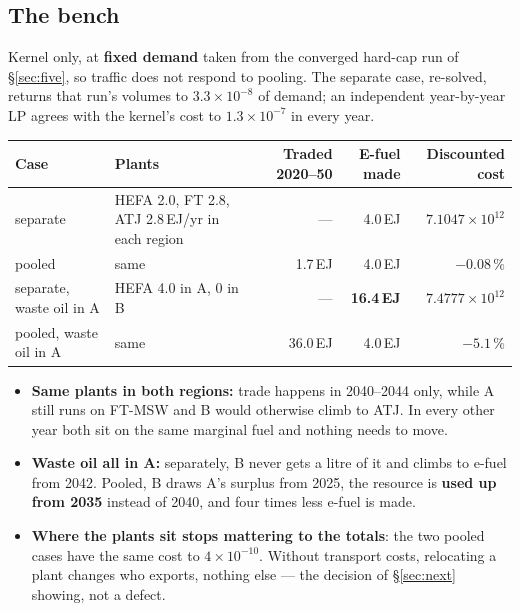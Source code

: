 \documentclass[11pt,a4paper]{article}
\begin{document}
\subsection{The bench}

Kernel only, at \textbf{fixed demand} taken from the converged hard-cap run of
\S\ref{sec:five}, so traffic does not respond to pooling. The separate case, re-solved, returns
that run's volumes to $3.3\times10^{-8}$ of demand; an independent year-by-year LP agrees with
the kernel's cost to $1.3\times10^{-7}$ in every year.

\begin{center}\footnotesize
\begin{tabular}{@{}lp{3.5cm}rrr@{}}
\toprule
\textbf{Case} & \textbf{Plants} & \textbf{Traded 2020--50} & \textbf{E-fuel made} & \textbf{Discounted cost} \\
\midrule
separate & HEFA 2.0, FT 2.8, ATJ 2.8\,EJ/yr in each region & --- & 4.0\,EJ & $7.1047\times10^{12}$ \\
pooled & same & 1.7\,EJ & 4.0\,EJ & $-0.08\,\%$ \\
separate, waste oil in A & HEFA 4.0 in A, 0 in B & --- & \textbf{16.4\,EJ} & $7.4777\times10^{12}$ \\
pooled, waste oil in A & same & 36.0\,EJ & 4.0\,EJ & $\mathbf{-5.1\,\%}$ \\
\bottomrule
\end{tabular}
\end{center}

\begin{itemize}[leftmargin=*,nosep]
  \item \textbf{Same plants in both regions:} trade happens in 2040--2044 only, while A still runs
    on FT-MSW and B would otherwise climb to ATJ. In every other year both sit on the same
    marginal fuel and nothing needs to move.
  \item \textbf{Waste oil all in A:} separately, B never gets a litre of it and climbs to e-fuel
    from 2042. Pooled, B draws A's surplus from 2025, the resource is \textbf{used up from 2035}
    instead of 2040, and four times less e-fuel is made.
  \item \textbf{Where the plants sit stops mattering to the totals}: the two pooled cases have the
    same cost to $4\times10^{-10}$. Without transport costs, relocating a plant changes who
    exports, nothing else --- the decision of \S\ref{sec:next} showing, not a defect.
\end{itemize}
\end{document}
